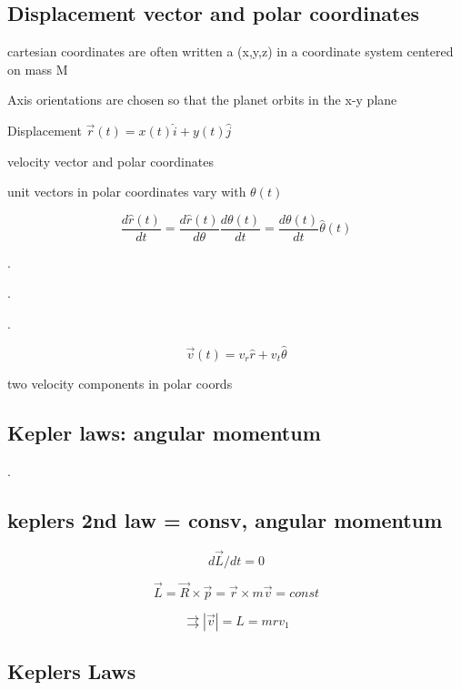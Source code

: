 \documentclass{article}
\begin{document}
\subsection{Displacement vector and polar coordinates}
\begin{list}{-}{}
\item cartesian coordinates are often written a (x,y,z) in a coordinate system centered on mass M
\item Axis orientations are chosen so that the planet orbits in the x-y plane
\item Displacement $\vec{r}(t) =x(t)\hat{i} +y(t)\hat{j}$
\end{list}

velocity vector and polar coordinates
\begin{list}{-}{}
\item unit vectors in polar coordinates vary with $\theta(t)$
\item \[\frac{d\hat{r}(t)}{dt} = \frac{d\hat{r}(t)}{d\theta} \frac{d\theta(t)}{dt} = \frac{d\theta(t)}{dt} \hat{\theta}(t)\]
\item .
\item .
\item .
\item \[\vec{v}(t) = v_r\hat{r} +v_t\hat{\theta}\]
\item two velocity components in polar coords 
\end{list}

\subsection{Kepler laws: angular momentum}
\begin{list}{-}{}
\item .
\end{list}

\subsection{keplers 2nd law = consv, angular momentum}
\begin{list}{-}{}
\item \[d\vec{L}/dt=0\]
\item \[\vec{L} =\vec{R} \times\vec{p} = \vec{r}\times m\vec{v}= const\]
\item \[\rightrightarrows |\vec{v}|=L = mrv_1\]
\end{list}

\subsection{Keplers Laws}
\end{document}
